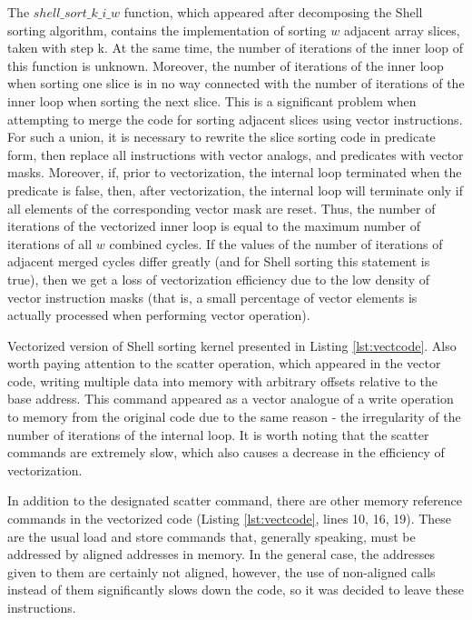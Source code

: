 \documentclass[
11pt,%
tightenlines,%
twoside,%
onecolumn,%
nofloats,%
nobibnotes,%
nofootinbib,%
superscriptaddress,%
noshowpacs,%
centertags]%
{revtex4}
\begin{document}
The $ shell\_sort\_k\_i\_w $ function, which appeared after decomposing the Shell sorting algorithm, contains the implementation of sorting $ w $ adjacent array slices, taken with step k. 
At the same time, the number of iterations of the inner loop of this function is unknown.
Moreover, the number of iterations of the inner loop when sorting one slice is in no way connected with the number of iterations of the inner loop when sorting the next slice.
This is a significant problem when attempting to merge the code for sorting adjacent slices using vector instructions.
For such a union, it is necessary to rewrite the slice sorting code in predicate form, then replace all instructions with vector analogs, and predicates with vector masks.
Moreover, if, prior to vectorization, the internal loop terminated when the predicate is false, then, after vectorization, the internal loop will terminate only if all elements of the corresponding vector mask are reset.
Thus, the number of iterations of the vectorized inner loop is equal to the maximum number of iterations of all $ w $ combined cycles.
If the values of the number of iterations of adjacent merged cycles differ greatly (and for Shell sorting this statement is true), then we get a loss of vectorization efficiency due to the low density of vector instruction masks (that is, a small percentage of vector elements is actually processed when performing vector operation).

Vectorized version of Shell sorting kernel presented in Listing \ref{lst:vectcode}. Also worth paying attention to the scatter operation, which appeared in the vector code, writing multiple data into memory with arbitrary offsets relative to the base address.
This command appeared as a vector analogue of a write operation to memory from the original code due to the same reason - the irregularity of the number of iterations of the internal loop.
It is worth noting that the scatter commands are extremely slow, which also causes a decrease in the efficiency of vectorization.

In addition to the designated scatter command, there are other memory reference commands in the vectorized code (Listing \ref{lst:vectcode}, lines 10, 16, 19).
These are the usual load and store commands that, generally speaking, must be addressed by aligned addresses in memory.
In the general case, the addresses given to them are certainly not aligned, however, the use of non-aligned calls instead of them significantly slows down the code, so it was decided to leave these instructions.
\end{document}
